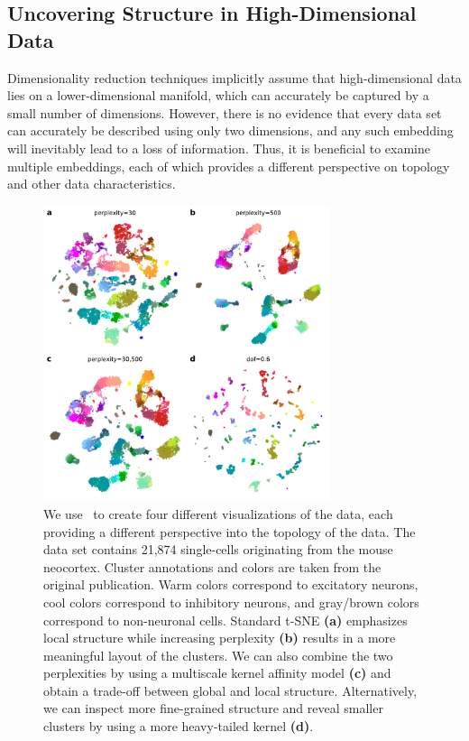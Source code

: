 \documentclass[article]{jss}
\newcommand{\opentsne}{\pkg{openTSNE}}
\begin{document}
\subsection{Uncovering Structure in High-Dimensional Data}

Dimensionality reduction techniques implicitly assume that high-dimensional data
lies on a lower-dimensional manifold, which can accurately be captured by a
small number of dimensions. However, there is no evidence that every data set
can accurately be described using only two dimensions, and any such embedding
will inevitably lead to a loss of information. Thus, it is beneficial to examine
multiple embeddings, each of which provides a different perspective on topology
and other data characteristics.

\begin{figure}[htbp]
  \center
  \includegraphics[width=0.75\textwidth]{tasic2018}
  \caption{\label{fig:tasic}
  We use \opentsne\ to create four different
  visualizations of the \citet{tasic2018shared} data,
  each providing a different perspective into the topology of the data.
  The data set contains 21,874 single-cells originating from the mouse
  neocortex. Cluster annotations and colors are taken from the original
  publication. Warm colors correspond to excitatory neurons, cool colors
  correspond to inhibitory neurons, and gray/brown colors correspond to
  non-neuronal cells. Standard t-SNE \textbf{(a)} emphasizes local
  structure while increasing perplexity \textbf{(b)} results in a more
  meaningful layout of the clusters. We can also combine the two
  perplexities by using a multiscale kernel affinity model \textbf{(c)}
  and obtain a trade-off between global and local structure.
  Alternatively, we can inspect more fine-grained structure and reveal
  smaller clusters by using a more heavy-tailed kernel \textbf{(d)}.}
\end{figure}
\end{document}
